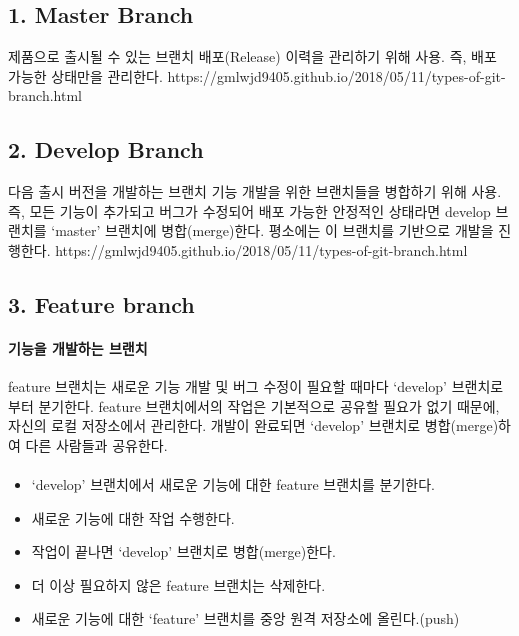 \documentclass[12pt, a4paper, oneside]{book}
\begin{document}
	\subsection{1. Master Branch}
		제품으로 출시될 수 있는 브랜치
		배포(Release) 이력을 관리하기 위해 사용. 즉, 배포 가능한 상태만을 관리한다.
		https://gmlwjd9405.github.io/2018/05/11/types-of-git-branch.html

	\subsection{2. Develop Branch}
다음 출시 버전을 개발하는 브랜치
기능 개발을 위한 브랜치들을 병합하기 위해 사용. 즉, 모든 기능이 추가되고 버그가 수정되어 배포 가능한 안정적인 상태라면 develop 브랜치를 ‘master’ 브랜치에 병합(merge)한다.
평소에는 이 브랜치를 기반으로 개발을 진행한다.
https://gmlwjd9405.github.io/2018/05/11/types-of-git-branch.html


	\subsection{3. Feature branch}

		\paragraph{기능을 개발하는 브랜치}
		feature 브랜치는 새로운 기능 개발 및 버그 수정이 필요할 때마다 ‘develop’ 브랜치로부터 분기한다. 
		feature 브랜치에서의 작업은 기본적으로 공유할 필요가 없기 때문에, 자신의 로컬 저장소에서 관리한다.
		개발이 완료되면 ‘develop’ 브랜치로 병합(merge)하여 다른 사람들과 공유한다.
		
		\paragraph{}

		\begin{itemize}
			\item		‘develop’ 브랜치에서 새로운 기능에 대한 feature 브랜치를 분기한다.
			\item		새로운 기능에 대한 작업 수행한다.
			\item		작업이 끝나면 ‘develop’ 브랜치로 병합(merge)한다.
			\item		더 이상 필요하지 않은 feature 브랜치는 삭제한다.
			\item		새로운 기능에 대한 ‘feature’ 브랜치를 중앙 원격 저장소에 올린다.(push)
		\end{itemize}
\end{document}
